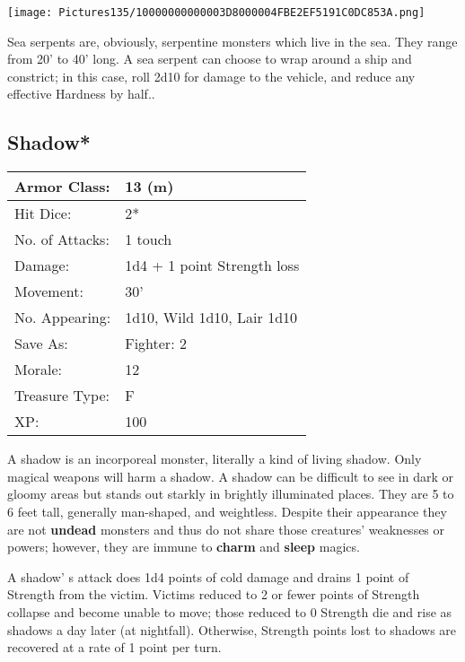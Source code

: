 \documentclass[a4paper,twoside,openany,10pt]{book}
\begin{document}
\begin{multicols}{2}
\begin{center} \texttt{[image: Pictures135/10000000000003D8000004FBE2EF5191C0DC853A.png]} \end{center}

Sea serpents are, obviously, serpentine monsters which live in the sea. They range from 20' to 40' long. A sea serpent can choose to wrap around a ship and constrict; in this case, roll 2d10 for damage to the vehicle, and reduce any effective Hardness by half..


\subsection*{Shadow*}\label{shadow}

\begin{tabularx}{0.50\textwidth}{@{}lX@{}}
Armor Class: & 13 (m) \\\hline
Hit Dice: & 2* \\\hline
No. of Attacks: & 1 touch \\\hline
Damage: & 1d4 + 1 point Strength loss \\\hline
Movement: & 30' \\\hline
No. Appearing: & 1d10, Wild 1d10, Lair 1d10 \\\hline
Save As: & Fighter: 2 \\\hline
Morale: & 12 \\\hline
Treasure Type: & F \\\hline
XP: & 100 \\\hline
\end{tabularx}\medskip

A shadow is an incorporeal monster, literally a kind of living shadow. Only magical weapons will harm a shadow. A shadow can be difficult to see in dark or gloomy areas but stands out starkly in brightly illuminated places. They are 5 to 6 feet tall, generally man-shaped, and weightless. Despite their appearance they are not \textbf{undead} monsters and thus do not share those creatures' weaknesses or powers; however, they are immune to \textbf{charm }and \textbf{sleep }magics.

A shadow' s attack does 1d4 points of cold damage and drains 1 point of Strength from the victim. Victims reduced to 2 or fewer points of Strength collapse and become unable to move; those reduced to 0 Strength die and rise as shadows a day later (at nightfall). Otherwise, Strength points lost to shadows are recovered at a rate of 1 point per turn.


\end{multicols}
\end{document}
